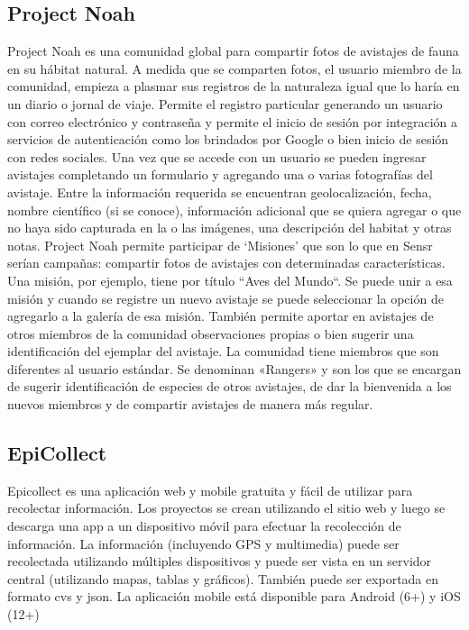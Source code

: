 \subsection{Project Noah}
Project Noah es una comunidad global para compartir fotos de avistajes de fauna en su hábitat natural. A medida que se comparten fotos, el usuario miembro de la comunidad, empieza a plasmar sus registros de la naturaleza igual que lo haría en un diario o jornal de viaje. 
Permite el registro particular generando un usuario con correo electrónico y contraseña y permite el inicio de sesión por integración a servicios de autenticación como los brindados por Google o bien inicio de sesión con redes sociales.
Una vez que se accede con un usuario se pueden ingresar avistajes completando un formulario y agregando una o varias fotografías del avistaje. Entre la información requerida se encuentran geolocalización, fecha, nombre científico (si se conoce), información adicional que se quiera agregar o que no haya sido capturada en la o las imágenes, una descripción del habitat y otras notas. 
Project Noah permite participar de ‘Misiones’ que son lo que en Sensr serían campañas: compartir fotos de avistajes con determinadas características. Una misión, por ejemplo, tiene por título ``Aves del Mundo“. Se puede unir a esa misión y cuando se registre un nuevo avistaje se puede seleccionar la opción de agregarlo a la galería de esa misión. También permite aportar en avistajes de otros miembros de la comunidad observaciones propias o bien sugerir una identificación del ejemplar del avistaje.
La comunidad tiene miembros que son diferentes al usuario estándar. Se denominan «Rangers» y son los que se encargan de sugerir identificación de especies de otros avistajes, de dar la bienvenida a los nuevos miembros y de compartir avistajes de manera más regular. \cite{projectNoah} 

\subsection{EpiCollect}
Epicollect es una aplicación web y mobile gratuita y fácil de utilizar para recolectar información. Los proyectos se crean utilizando el sitio web y luego se descarga una app a un dispositivo móvil para efectuar la recolección de información. 
La información (incluyendo GPS y multimedia) puede ser recolectada utilizando múltiples dispositivos y puede ser vista en un servidor central (utilizando mapas, tablas y gráficos).
También puede ser exportada en formato cvs y json.
La aplicación mobile está disponible para Android (6+) y iOS (12+)


